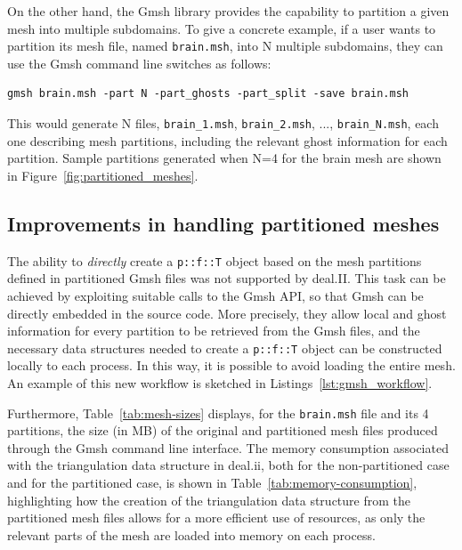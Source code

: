 \documentclass[a4paper,12pt]{article}
\begin{document}
On the other hand, the Gmsh library provides the capability to partition a given mesh
into multiple subdomains. To give a concrete example, if a user
wants to partition its mesh file, named \texttt{brain.msh}, into N multiple subdomains, they can use the Gmsh command line switches as follows:
\begin{lstlisting}[caption=Partitioning a .msh file via command line switches]
gmsh brain.msh -part N -part_ghosts -part_split -save brain.msh
\end{lstlisting}
This would generate N files, \texttt{brain\_1.msh}, \texttt{brain\_2.msh}, ..., \texttt{brain\_{N}.msh}, each one
describing mesh partitions, including the relevant ghost information for each partition. Sample partitions generated
when N=4 for the brain mesh are shown in Figure~\ref{fig:partitioned_meshes}.

\subsection{Improvements in handling partitioned meshes}
The ability to \emph{directly} create a \texttt{p::f::T} object based on the mesh partitions defined in partitioned Gmsh files was not supported
by deal.II. This task can be achieved by exploiting suitable calls to the Gmsh API, so that Gmsh can be directly
embedded in the source code. More precisely, they allow local and ghost information for every partition to be retrieved from
the Gmsh files, and the necessary data structures needed to create a \texttt{p::f::T} object can be constructed locally to each process. In
this way, it is possible to avoid loading the entire mesh. An example of this new workflow is
sketched in Listings~\ref{lst:gmsh_workflow}.

Furthermore, Table~\ref{tab:mesh-sizes} displays, for the \texttt{brain.msh} file and its 4 partitions, the size (in MB) of the original and partitioned mesh files produced through the Gmsh command line
interface. The memory consumption associated with the triangulation data structure in deal.ii, both for the non-partitioned case and for
the partitioned case, is shown in Table~\ref{tab:memory-consumption}, highlighting how the creation of the triangulation data
structure from the partitioned mesh files allows for a more efficient use of resources, as only the relevant parts of
the mesh are loaded into memory on each process.
\end{document}
